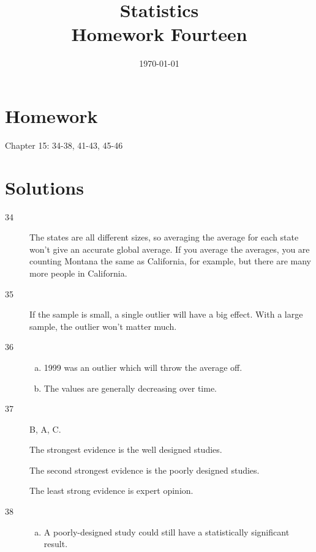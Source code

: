 \documentclass[letterpaper, landscape]{exam}
\title{Statistics \\ Homework Fourteen}
\date{\today}
\author{}
\begin{document}
  \maketitle

  \section{Homework}
  Chapter 15: 34-38, 41-43, 45-46

  \ifprintanswers
    \section{Solutions}
    \begin{description}

      \item[34] 
        The states are all different sizes, so averaging the average for each
        state won't give an accurate global average. If you average the
        averages, you are counting Montana the same as California, for example,
        but there are many more people in California.

      \item[35] If the sample is small, a single outlier will have a big effect.
        With a large sample, the outlier won't matter much. 

      \item[36] 
        
        \begin{enumerate}[(a)]
          \item 1999 was an outlier which will throw the average off.
          \item The values are generally decreasing over time.
        \end{enumerate}

      \item[37] B, A, C.

        The strongest evidence is the well designed studies.

        The second strongest evidence is the poorly designed studies.

        The least strong evidence is expert opinion.

      \item[38]
        \begin{enumerate}[(a)]
          \item A poorly-designed study could still have a statistically
            significant result.


\end{enumerate}
\end{description}
\end{document}
